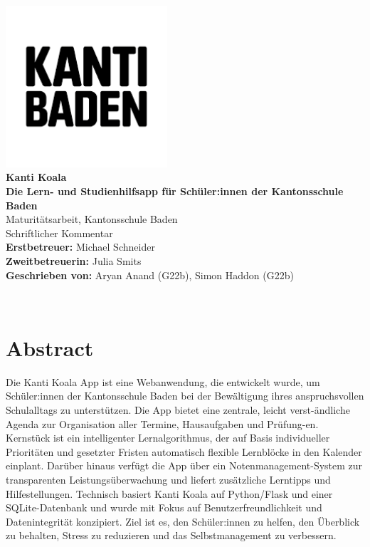 \documentclass[12pt,a4paper]{report}
\begin{document}
\makeatletter
\begin{titlepage}
    \centering
    \vspace*{1cm}
       { \includegraphics[width=6cm]{img/kanti-baden.png}}\\[1cm]

    {\LARGE \textbf{Kanti Koala}}\\
    {\textbf{Die Lern- und Studienhilfsapp für Schüler:innen der Kantonsschule Baden}}\\[1cm]

    {Maturitätsarbeit, Kantonsschule Baden}\\
    {Schriftlicher Kommentar}\\[1cm]
    
    \textbf{Erstbetreuer: }{Michael Schneider}\\
    \textbf{Zweitbetreuerin: }{Julia Smits}\\[1cm]
    
    \textbf{Geschrieben von: }{Aryan Anand (G22b), Simon Haddon (G22b)}\\[1cm]
    \date{\large Datum: 11. November 2025}
    {\@date\\}
\end{titlepage}
\makeatother

\chapter*{Abstract}
Die Kanti Koala App ist eine Webanwendung, die entwickelt wurde, um Schüler:innen der Kantonsschule Baden bei der Bewältigung ihres anspruchsvollen Schulalltags zu unterstützen. 
Die App bietet eine zentrale, leicht verst-ändliche Agenda zur Organisation aller Termine, Hausaufgaben und Prüfung-en. 
Kernstück ist ein intelligenter Lernalgorithmus, der auf Basis individueller Prioritäten und gesetzter Fristen automatisch flexible Lernblöcke in den Kalender einplant. 
Darüber hinaus verfügt die App über ein Notenmanagement-System zur transparenten Leistungsüberwachung und liefert zusätzliche Lerntipps und Hilfestellungen. Technisch basiert Kanti Koala auf Python/Flask und einer SQLite-Datenbank und wurde mit Fokus auf Benutzerfreundlichkeit und Datenintegrität konzipiert. Ziel ist es, den Schüler:innen zu helfen, den Überblick zu behalten, Stress zu reduzieren und das Selbstmanagement zu verbessern.
\pagebreak
\end{document}

